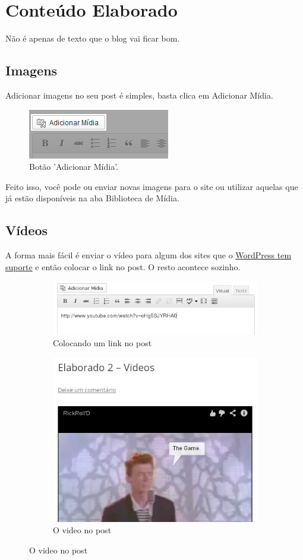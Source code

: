 \documentclass[12pt,onecolumn]{article}
\begin{document}
\section{Conteúdo Elaborado}
	Não é apenas de texto que o blog vai ficar bom.
	\subsection{Imagens}
		Adicionar imagens no seu post é simples, basta clica em Adicionar Mídia.
		\begin{figure}[H]
			\centering
			\includegraphics{midia1.png}
			\caption{Botão 'Adicionar Mídia'.}
		\end{figure}
		Feito isso, você pode ou enviar novas imagens para o site ou utilizar 
		aquelas que já estão disponíveis na aba Biblioteca de Mídia.
	\subsection{Vídeos}
		A forma mais fácil é enviar o vídeo para algum dos sites que o 
		\href{http://codex.wordpress.org/Embeds}{WordPress tem suporte} e 
		então colocar o link no post. O resto acontece sozinho.
		\begin{figure}[H]
			\begin{subfigure}{.5\textwidth}
				\centering
				\includegraphics{video1.png}
				\caption{Colocando um link no post}
			\end{subfigure}
			\begin{subfigure}{.5\textwidth}
				\centering
				\includegraphics{video2.png}
				\caption{O video no post}
			\end{subfigure}
		\end{figure}
		
\end{document}
